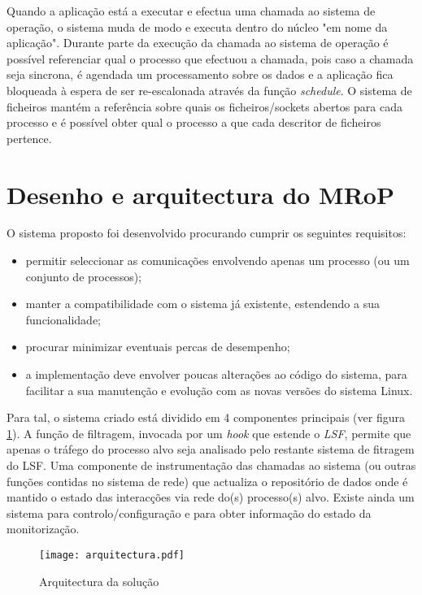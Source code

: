 Quando a aplicação está a executar e efectua uma chamada ao sistema de operação, o sistema muda de modo e executa dentro do núcleo "em nome da aplicação".
 Durante parte da execução da chamada ao sistema de operação é possível referenciar qual o processo que efectuou a chamada, pois caso a chamada seja sincrona, é agendada um processamento sobre os dados e a aplicação fica bloqueada à espera de ser re-escalonada através da função \textit{schedule}.
 O sistema de ficheiros mantém a referência sobre quais os ficheiros/sockets abertos para cada processo e é possível obter qual o processo a que cada descritor de ficheiros pertence. %

\section{Desenho e arquitectura do MRoP}
\label{sec:mrop_architecture}

O sistema proposto foi desenvolvido procurando cumprir os seguintes requisitos:
\begin{itemize}
\item permitir seleccionar as comunicações envolvendo apenas um processo (ou um conjunto de processos);
\item manter a compatibilidade com o sistema já existente, estendendo a sua funcionalidade;
\item procurar minimizar eventuais percas de desempenho;
\item a implementação deve envolver poucas alterações ao código do sistema, para facilitar a sua manutenção e evolução com as novas versões do sistema Linux.
\end{itemize}

Para tal, o sistema criado está dividido em 4 componentes principais (ver figura \ref{arquitectura}).
A função de filtragem, invocada por um \textit{hook} que estende o \textit{LSF}, permite que apenas o tráfego do processo alvo seja analisado pelo restante sistema de fitragem do LSF.
Uma componente de instrumentação das chamadas ao sistema (ou outras funções contidas no sistema de rede) que actualiza o repositório de dados onde é mantido o estado das interacções via rede do(s) processo(s) alvo.
Existe ainda um sistema para controlo/configuração e para obter informação do estado da monitorização.

\begin{figure}[htbp]
\begin{center}
\texttt{[image: arquitectura.pdf]} 
\caption{Arquitectura da solução}
\label{arquitectura}
\end{center}
\end{figure}


